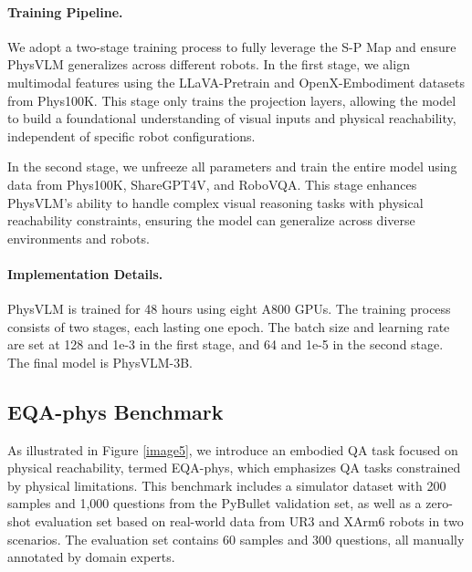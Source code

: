 \documentclass[10pt,twocolumn,letterpaper]{article}
\begin{document}
\paragraph{Training Pipeline.}
We adopt a two-stage training process to fully leverage the S-P Map and ensure PhysVLM generalizes across different robots. In the first stage, we align multimodal features using the LLaVA-Pretrain and OpenX-Embodiment datasets from Phys100K. This stage only trains the projection layers, allowing the model to build a foundational understanding of visual inputs and physical reachability, independent of specific robot configurations.

In the second stage, we unfreeze all parameters and train the entire model using data from Phys100K, ShareGPT4V, and RoboVQA. This stage enhances PhysVLM's ability to handle complex visual reasoning tasks with physical reachability constraints, ensuring the model can generalize across diverse environments and robots.


\paragraph{Implementation Details.} 
PhysVLM is trained for 48 hours using eight A800 GPUs. The training process consists of two stages, each lasting one epoch. The batch size and learning rate are set at 128 and 1e-3 in the first stage, and 64 and 1e-5 in the second stage. The final model is PhysVLM-3B.

\subsection{EQA-phys Benchmark} 
As illustrated in Figure \ref{image5}, we introduce an embodied QA task focused on physical reachability, termed EQA-phys, which emphasizes QA tasks constrained by physical limitations. This benchmark includes a simulator dataset with 200 samples and 1,000 questions from the PyBullet validation set, as well as a zero-shot evaluation set based on real-world data from UR3 and XArm6 robots in two scenarios. The evaluation set contains 60 samples and 300 questions, all manually annotated by domain experts.
\end{document}
